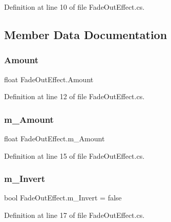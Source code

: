 Definition at line 10 of file Fade\+Out\+Effect.\+cs.



\subsection{Member Data Documentation}
\mbox{\label{class_fade_out_effect_ade319a3793dfb08826bae81d06e1f631}} 
\subsubsection{\texorpdfstring{Amount}{Amount}}
{\footnotesize\ttfamily float Fade\+Out\+Effect.\+Amount\hspace{0.3cm}{\ttfamily [static]}}



Definition at line 12 of file Fade\+Out\+Effect.\+cs.

\mbox{\label{class_fade_out_effect_a39a131a475ba9b43aa3415917098f316}} 
\subsubsection{\texorpdfstring{m\+\_\+\+Amount}{m\_Amount}}
{\footnotesize\ttfamily float Fade\+Out\+Effect.\+m\+\_\+\+Amount}



Definition at line 15 of file Fade\+Out\+Effect.\+cs.

\mbox{\label{class_fade_out_effect_a83f178e53cc0b59b5213b106f73767cb}} 
\subsubsection{\texorpdfstring{m\+\_\+\+Invert}{m\_Invert}}
{\footnotesize\ttfamily bool Fade\+Out\+Effect.\+m\+\_\+\+Invert = false}



Definition at line 17 of file Fade\+Out\+Effect.\+cs.

